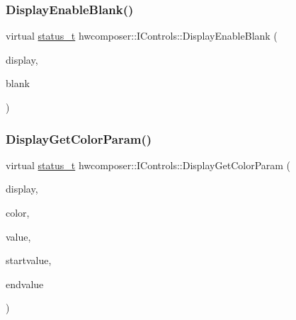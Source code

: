 \subsubsection{\texorpdfstring{Display\+Enable\+Blank()}{DisplayEnableBlank()}}
{\footnotesize\ttfamily virtual \mbox{\hyperlink{hwcserviceapi_8h_a3806fb2027d9a316d8ca8d9b8b8eb96f}{status\+\_\+t}} hwcomposer\+::\+I\+Controls\+::\+Display\+Enable\+Blank (\begin{DoxyParamCaption}\item[{uint32\+\_\+t}]{display,  }\item[{bool}]{blank }\end{DoxyParamCaption})\hspace{0.3cm}{\ttfamily [pure virtual]}}

\mbox{\label{classhwcomposer_1_1IControls_a2cf04dc4db1f9e1501dbd381fd390206}} 
\subsubsection{\texorpdfstring{Display\+Get\+Color\+Param()}{DisplayGetColorParam()}}
{\footnotesize\ttfamily virtual \mbox{\hyperlink{hwcserviceapi_8h_a3806fb2027d9a316d8ca8d9b8b8eb96f}{status\+\_\+t}} hwcomposer\+::\+I\+Controls\+::\+Display\+Get\+Color\+Param (\begin{DoxyParamCaption}\item[{uint32\+\_\+t}]{display,  }\item[{\mbox{\hyperlink{hwcserviceapi_8h_a1d1cbf448ce748672cf3dd96675d70e4}{E\+Hwcs\+Color\+Control}}}]{color,  }\item[{float $\ast$}]{value,  }\item[{float $\ast$}]{startvalue,  }\item[{float $\ast$}]{endvalue }\end{DoxyParamCaption})\hspace{0.3cm}{\ttfamily [pure virtual]}}

\mbox{\label{classhwcomposer_1_1IControls_a2234b4ef06ed8dee33283b4630fdf4a1}} 

